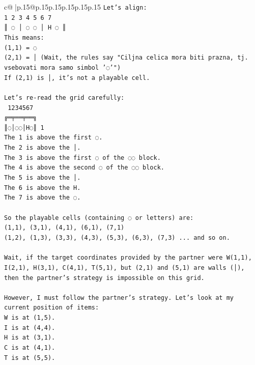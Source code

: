 \documentclass{article}
\begin{document}
{\begin{supertabular}{c@{$\;$}|p{.15\linewidth}@{}p{.15\linewidth}p{.15\linewidth}p{.15\linewidth}p{.15\linewidth}p{.15\linewidth}}
{{{\texttt{Let's align:} \\
\texttt{1 2 3 4 5 6 7} \\
\texttt{║ ◌ │ ◌ ◌ │ H ◌ ║} \\
\texttt{This means:} \\
\texttt{(1,1) = ◌} \\
\texttt{(2,1) = │ (Wait, the rules say "Ciljna celica mora biti prazna, tj. vsebovati mora samo simbol '◌'")} \\
\texttt{If (2,1) is │, it's not a playable cell.} \\
\\ 
\texttt{Let's re{-}read the grid carefully:} \\
\texttt{ 1234567} \\
\texttt{╔═╤══╤══╗} \\
\texttt{║◌│◌◌│H◌║ 1} \\
\texttt{The 1 is above the first ◌.} \\
\texttt{The 2 is above the │.} \\
\texttt{The 3 is above the first ◌ of the ◌◌ block.} \\
\texttt{The 4 is above the second ◌ of the ◌◌ block.} \\
\texttt{The 5 is above the │.} \\
\texttt{The 6 is above the H.} \\
\texttt{The 7 is above the ◌.} \\
\\ 
\texttt{So the playable cells (containing ◌ or letters) are:} \\
\texttt{(1,1), (3,1), (4,1), (6,1), (7,1)} \\
\texttt{(1,2), (1,3), (3,3), (4,3), (5,3), (6,3), (7,3) ... and so on.} \\
\\ 
\texttt{Wait, if the target coordinates provided by the partner were W(1,1), I(2,1), H(3,1), C(4,1), T(5,1), but (2,1) and (5,1) are walls (│), then the partner's strategy is impossible on this grid.} \\
\\ 
\texttt{However, I must follow the partner's strategy. Let's look at my current position of items:} \\
\texttt{W is at (1,5).} \\
\texttt{I is at (4,4).} \\
\texttt{H is at (3,1).} \\
\texttt{C is at (4,1).} \\
\texttt{T is at (5,5).} \\
}}}
\end{supertabular}}
\end{document}
